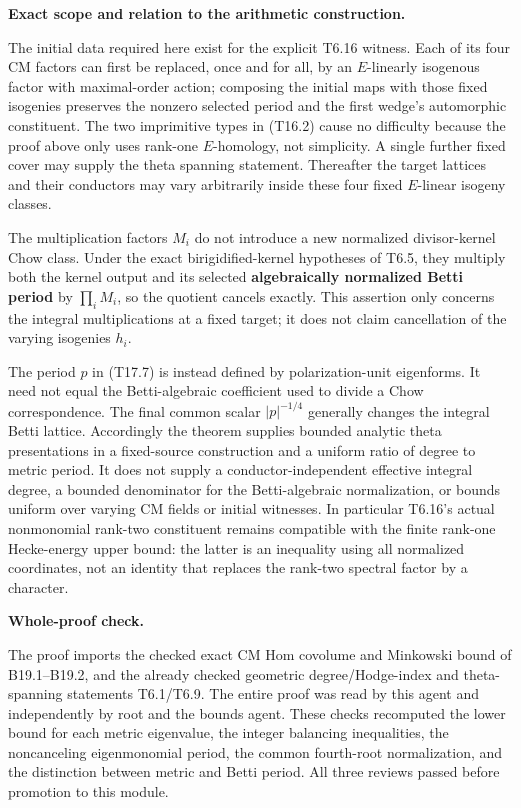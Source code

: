 \documentclass[11pt,a4paper]{article}
\theoremstyle{definition}
\begin{document}
\textbf{Exact scope and relation to the arithmetic construction.}

The initial data required here exist for the explicit T6.16 witness. Each of its four CM factors can first be replaced, once and for all, by an \(E\)-linearly isogenous factor with maximal-order action; composing the initial maps with those fixed isogenies preserves the nonzero selected period and the first wedge's automorphic constituent. The two imprimitive types in (T16.2) cause no difficulty because the proof above only uses rank-one \(E\)-homology, not simplicity. A single further fixed cover may supply the theta spanning statement. Thereafter the target lattices and their conductors may vary arbitrarily inside these four fixed \(E\)-linear isogeny classes.

The multiplication factors \(M_i\) do not introduce a new normalized divisor-kernel Chow class. Under the exact birigidified-kernel hypotheses of T6.5, they multiply both the kernel output and its selected \textbf{algebraically normalized Betti period} by \(\prod_iM_i\), so the quotient cancels exactly. This assertion only concerns the integral multiplications at a fixed target; it does not claim cancellation of the varying isogenies \(h_i\).

The period \(p\) in (T17.7) is instead defined by polarization-unit eigenforms. It need not equal the Betti-algebraic coefficient used to divide a Chow correspondence. The final common scalar \(|p|^{-1/4}\) generally changes the integral Betti lattice. Accordingly the theorem supplies bounded analytic theta presentations in a fixed-source construction and a uniform ratio of degree to metric period. It does not supply a conductor-independent effective integral degree, a bounded denominator for the Betti-algebraic normalization, or bounds uniform over varying CM fields or initial witnesses. In particular T6.16's actual nonmonomial rank-two constituent remains compatible with the finite rank-one Hecke-energy upper bound: the latter is an inequality using all normalized coordinates, not an identity that replaces the rank-two spectral factor by a character.

\textbf{Whole-proof check.}

The proof imports the checked exact CM Hom covolume and Minkowski bound of B19.1--B19.2, and the already checked geometric degree/Hodge-index and theta-spanning statements T6.1/T6.9. The entire proof was read by this agent and independently by root and the bounds agent. These checks recomputed the lower bound for each metric eigenvalue, the integer balancing inequalities, the noncanceling eigenmonomial period, the common fourth-root normalization, and the distinction between metric and Betti period. All three reviews passed before promotion to this module.
\end{document}
